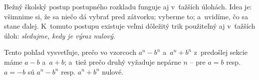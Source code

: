 Bežný školský postup postupného rozkladu funguje aj v~ťažších úlohách. Idea je: všimnime si, že sa niečo dá vybrať pred zátvorku; vyberme to; a~uvidíme, čo sa stane ďalej. K~tomuto postupu existuje veľmi dôležitý trik použiteľný aj v~ťažších úloh: \textit{sledujme, kedy je výraz nulový}.


Tento pohľad vysvetľuje, prečo vo vzorcoch $a^n-b^n$ a~$a^n+b^n$ z~predošlej sekcie máme $a-b$ a~$a+b$; a~tiež prečo druhý vyžaduje nepárne $n$ -- pre $a=b$ resp. $a=-b$ sú $a^n-b^n$ resp. $a^n + b^n$ nulové.

